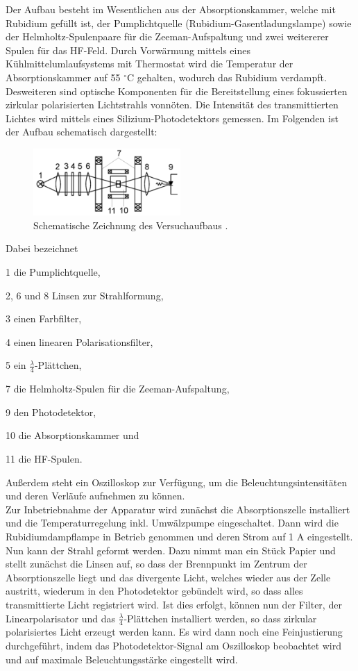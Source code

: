 \documentclass[bigchapter,colorback,accentcolor=tud4b,linedtoc,11pt]{tudreport}
\begin{document}
Der Aufbau besteht im Wesentlichen aus der Absorptionskammer, welche mit Rubidium gefüllt ist, der Pumplichtquelle (Rubidium-Gasentladungslampe) sowie der Helmholtz-Spulenpaare für die Zeeman-Aufspaltung und zwei weitererer Spulen für das HF-Feld. Durch Vorwärmung mittels eines Kühlmittelumlaufsystems mit Thermostat wird die Temperatur der Absorptionskammer auf 55 $^{\circ}$C gehalten, wodurch das Rubidium verdampft. Desweiteren sind optische Komponenten für die Bereitstellung eines fokussierten zirkular polarisierten Lichtstrahls vonnöten. Die Intensität des transmittierten Lichtes wird mittels eines Silizium-Photodetektors gemessen. Im Folgenden ist der Aufbau schematisch dargestellt:

\begin{figure}[H] 
  \centering
     \includegraphics[width=0.5\textwidth]{img/Aufbau.jpg}
     \caption{Schematische Zeichnung des Versuchaufbaus \cite{Anleitung}.}
\end{figure}

Dabei bezeichnet

1 die Pumplichtquelle,

2, 6 und 8 Linsen zur Strahlformung,

3 einen Farbfilter,

4 einen linearen Polarisationsfilter,

5 ein $\frac{\lambda}{4}$-Plättchen,

7 die Helmholtz-Spulen für die Zeeman-Aufspaltung,

9 den Photodetektor,

10 die Absorptionskammer und

11 die HF-Spulen.

Außerdem steht ein Oszilloskop zur Verfügung, um die Beleuchtungsintensitäten und deren Verläufe aufnehmen zu können.
\\

Zur Inbetriebnahme der Apparatur wird zunächst die Absorptionszelle installiert und die Temperaturregelung inkl. Umwälzpumpe eingeschaltet. Dann wird die Rubidiumdampflampe in Betrieb genommen und deren Strom auf 1 A eingestellt. Nun kann der Strahl geformt werden. Dazu nimmt man ein Stück Papier und stellt zunächst die Linsen auf, so dass der Brennpunkt im Zentrum der Absorptionszelle liegt und das divergente Licht, welches wieder aus der Zelle austritt, wiederum in den Photodetektor gebündelt wird, so dass alles transmittierte Licht registriert wird. Ist dies erfolgt, können nun der Filter, der Linearpolarisator und das $\frac{\lambda}{4}$-Plättchen installiert werden, so dass zirkular polarisiertes Licht erzeugt werden kann. Es wird dann noch eine Feinjustierung durchgeführt, indem das Photodetektor-Signal am Oszilloskop beobachtet wird und auf maximale Beleuchtungsstärke eingestellt wird.
\end{document}
